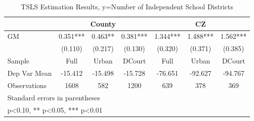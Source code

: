 \begin{table}[htbp]\centering
\def\sym#1{\ifmmode^{#1}\else\(^{#1}\)\fi}
\caption{TSLS Estimation Results, y=Number of Independent School Districts}
\begin{tabular}{l*{6}{c}}
\toprule
                &\multicolumn{3}{c}{County}            &\multicolumn{3}{c}{CZ}                \\\cmidrule(lr){2-4}\cmidrule(lr){5-7}
\midrule
GM              &    0.351***&    0.463** &    0.381***&    1.344***&    1.488***&    1.562***\\
                &  (0.110)   &  (0.217)   &  (0.130)   &  (0.320)   &  (0.371)   &  (0.385)   \\
\midrule
Sample          &     Full   &    Urban   &   DCourt   &     Full   &    Urban   &   DCourt   \\
Dep Var Mean    &  -15.412   &  -15.498   &  -15.728   &  -76.651   &  -92.627   &  -94.767   \\
Observations    &     1608   &      582   &     1200   &      639   &      378   &      369   \\
\bottomrule
\multicolumn{7}{l}{\footnotesize Standard errors in parentheses}\\
\multicolumn{7}{l}{\footnotesize * p<0.10, ** p<0.05, *** p<0.01}\\
\end{tabular}
\end{table}

